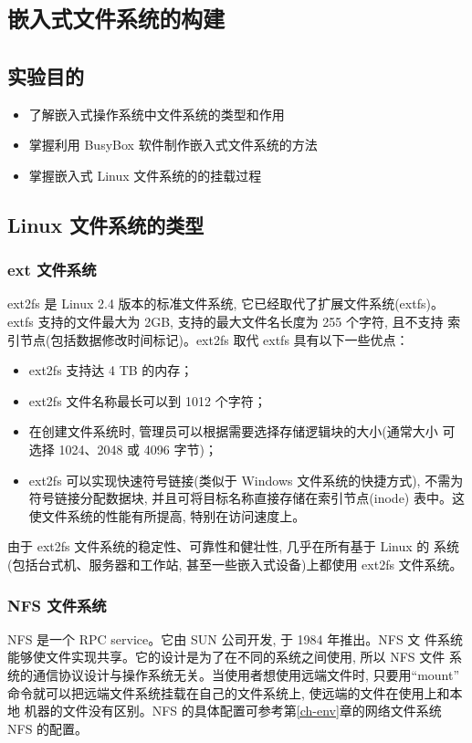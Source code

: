 \chapter{\tt 嵌入式文件系统的构建}\label{ch-fs}

\section{实验目的}
\begin{itemize}\itemsep=-3pt
  \item 了解嵌入式操作系统中文件系统的类型和作用
  \item 掌握利用 BusyBox 软件制作嵌入式文件系统的方法
  \item 掌握嵌入式 Linux 文件系统的的挂载过程
\end{itemize}

\section{Linux 文件系统的类型}
\subsection{ext 文件系统}
	ext2fs 是 Linux 2.4 版本的标准文件系统, 它已经取代了扩展文件系统(extfs)。
extfs 支持的文件最大为 2GB, 支持的最大文件名长度为 255 个字符, 且不支持
索引节点(包括数据修改时间标记)。ext2fs 取代 extfs 具有以下一些优点：
\begin{itemize}\itemsep=-3pt
  \item ext2fs 支持达 4 TB 的内存；
  \item ext2fs 文件名称最长可以到 1012 个字符；
  \item 在创建文件系统时, 管理员可以根据需要选择存储逻辑块的大小(通常大小
		可选择 1024、2048 或 4096 字节)；
  \item ext2fs 可以实现快速符号链接(类似于 Windows 文件系统的快捷方式), 
		不需为符号链接分配数据块, 并且可将目标名称直接存储在索引节点(inode)
		表中。这使文件系统的性能有所提高, 特别在访问速度上。
\end{itemize}
	由于 ext2fs 文件系统的稳定性、可靠性和健壮性, 几乎在所有基于 Linux 的
系统(包括台式机、服务器和工作站, 甚至一些嵌入式设备)上都使用 ext2fs 文件系统。

\subsection{NFS 文件系统}
	NFS 是一个 RPC service。它由 SUN 公司开发, 于 1984 年推出。NFS 文
件系统能够使文件实现共享。它的设计是为了在不同的系统之间使用, 所以 NFS 文件
系统的通信协议设计与操作系统无关。当使用者想使用远端文件时, 只要用``mount''
命令就可以把远端文件系统挂载在自己的文件系统上, 使远端的文件在使用上和本地
机器的文件没有区别。NFS 的具体配置可参考第\ref{ch-env}章的网络文件系统 NFS
的配置。

